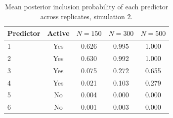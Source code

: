 \begin{table}[H]
\centering
\begin{tabular}{lcccc}
  \toprule
Predictor & Active & $N = 150$ & $N = 300$ & $N = 500$ \\ 
  \midrule
1 & Yes & 0.626 & 0.995 & 1.000 \\ 
  2 & Yes & 0.630 & 0.992 & 1.000 \\ 
  3 & Yes & 0.075 & 0.272 & 0.655 \\ 
  4 & Yes & 0.021 & 0.103 & 0.279 \\ 
  5 & No & 0.004 & 0.000 & 0.000 \\ 
  6 & No & 0.001 & 0.003 & 0.000 \\ 
   \bottomrule
\end{tabular}
\caption{Mean posterior inclusion probability of each predictor across replicates, simulation 2.} 
\label{table:sim2_pred_pip}
\end{table}
